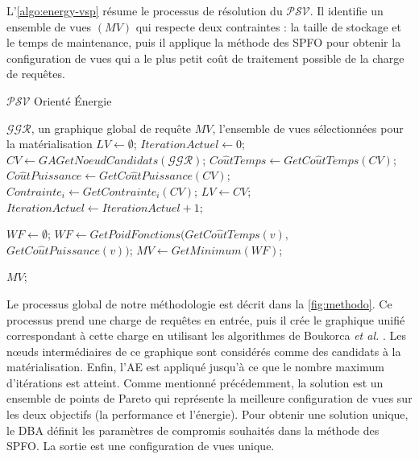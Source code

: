 L'\ref{algo:energy-vsp} résume le processus de résolution du $\mathcal{PSV}$. Il identifie un ensemble de vues $(MV)$ qui respecte deux contraintes : la taille de stockage et le temps de maintenance, puis il applique la méthode des SPFO pour obtenir la configuration de vues qui a le plus petit coût de traitement possible de la charge de requêtes.

\begin{algorithm}
\caption{$\mathcal{PSV}$ Orienté Énergie}
\label{algo:energy-vsp}
\begin{algorithmic}[1]
\Require $\mathcal{GGR}$, un graphique global de requête
\Ensure $MV$, l'ensemble de vues sélectionnées pour la matérialisation
\State $LV \leftarrow \emptyset$;
\State $IterationActuel \leftarrow 0$;
\State
{}
	\State $CV \leftarrow GAGetNoeudCandidats(\mathcal{GGR})$;
	\State $Co\hat{u}tTemps \leftarrow GetCo\hat{u}tTemps(CV)$;
	\State $Co\hat{u}tPuissance \leftarrow GetCo\hat{u}tPuissance(CV)$;
	\State $Contrainte_i \leftarrow GetContrainte_i(CV)$;
		\State $LV \leftarrow CV$;
	\EndIf
	\State $IterationActuel \leftarrow IterationActuel + 1$;
\EndWhile

\State
\State $WF \leftarrow \emptyset$;
	\State $WF \leftarrow GetPoidFonctions(GetCo\hat{u}tTemps(v),$ $ GetCo\hat{u}tPuissance(v))$;
\EndFor
\State $MV \leftarrow GetMinimum(WF)$;

\State
\State
\Return $MV$;
\end{algorithmic}
\end{algorithm}

Le processus global de notre méthodologie est décrit dans la \ref{fig:methodo}. Ce processus prend une charge de requêtes en entrée, puis il crée le graphique unifié correspondant à cette charge en utilisant les algorithmes de Boukorca \textit{et al.} \cite{Boukorca15}. Les nœuds intermédiaires de ce graphique sont considérés comme des candidats à la matérialisation. Enfin, l'AE est appliqué jusqu'à ce que le nombre maximum d'itérations est atteint. Comme mentionné précédemment, la solution est un ensemble de points de Pareto qui représente la meilleure configuration de vues sur les deux objectifs (la performance et l'énergie). Pour obtenir une solution unique, le DBA définit les paramètres de compromis souhaités dans la méthode des SPFO. La sortie est une configuration de vues unique.

